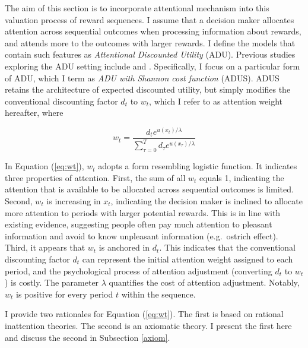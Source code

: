 \documentclass[
  12pt,
]{article}
\begin{document}
The aim of this section is to incorporate attentional mechanism into
this valuation process of reward sequences. I assume that a decision
maker allocates attention across sequential outcomes when processing
information about rewards, and attends more to the outcomes with larger
rewards. I define the models that contain such features as
\emph{Attentional Discounted Utility} (ADU). Previous studies exploring
the ADU setting include \citet{gershman_rationally_2020} and
\citet{noor_optimal_2022}. Specifically, I focus on a particular form of
ADU, which I term as \emph{ADU with Shannon cost function} (ADUS). ADUS
retains the architecture of expected discounted utility, but simply
modifies the conventional discounting factor \(d_t\) to \(w_t\), which I
refer to as attention weight hereafter, where

\begin{equation}\tag{1}\label{eq:wt}
w_t = \frac{d_t e^{u(x_t)/\lambda}}{\sum_{\tau=0}^T d_\tau e^{u(x_\tau)/\lambda}}
\end{equation}

In Equation (\ref{eq:wt}), \(w_t\) adopts a form resembling logistic
function. It indicates three properties of attention. First, the sum of
all \(w_t\) equals 1, indicating the attention that is available to be
allocated across sequential outcomes is limited. Second, \(w_t\) is
increasing in \(x_t\), indicating the decision maker is inclined to
allocate more attention to periods with larger potential rewards. This
is in line with existing evidence, suggesting people often pay much
attention to pleasant information and avoid to know unpleasant
information (e.g.~ostrich effect). Third, it appears that \(w_t\) is
anchored in \(d_t\). This indicates that the conventional discounting
factor \(d_t\) can represent the initial attention weight assigned to
each period, and the psychological process of attention adjustment
(converting \(d_t\) to \(w_t\)) is costly. The parameter \(\lambda\)
quantifies the cost of attention adjustment. Notably, \(w_t\) is
positive for every period \(t\) within the sequence.

I provide two rationales for Equation (\ref{eq:wt}). The first is based
on rational inattention theories. The second is an axiomatic theory. I
present the first here and discuss the second in Subsection \ref{axiom}.
\end{document}
